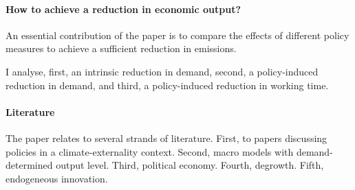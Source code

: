 \paragraph{How to achieve a reduction in economic output?}
An essential contribution of the paper is to compare the effects of different policy measures to achieve a sufficient reduction in emissions. 

I analyse, first, an intrinsic reduction in demand, second, a policy-induced reduction in demand, and third, a policy-induced reduction in working time.

\paragraph{Literature}
The paper relates to several strands of literature. First, to papers discussing policies in a climate-externality context. 
Second, macro models with demand-determined output level.
Third, political economy. 
Fourth, degrowth. 
Fifth, endogeneous innovation. 